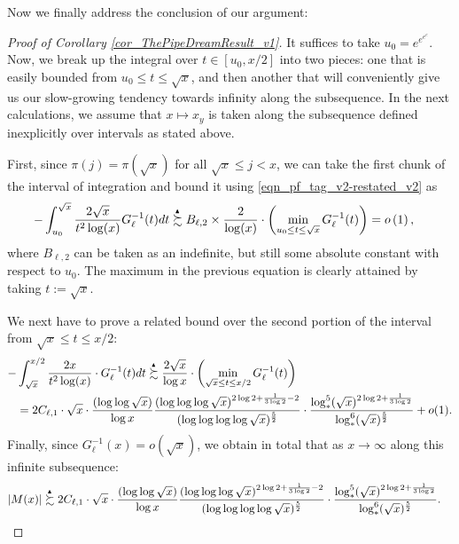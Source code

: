 \documentclass[11pt,reqno,a4letter]{article}
\numberwithin{figure}{section}
\numberwithin{table}{section}
\theoremstyle{plain}
\numberwithin{theorem}{section}
\theoremstyle{definition}
\newcommand{\SuccSim}[0]{\overset{_{\scriptsize{\blacktriangle}}}{\succsim}}
\begin{document}
Now we finally address the conclusion of our argument: 

\begin{proof}[Proof of Corollary \ref{cor_ThePipeDreamResult_v1}] 
\label{proofOf_cor_ThePipeDreamResult_v1} 
It suffices to take $u_0 = e^{e^{e^{e}}}$. 
Now, we break up the integral over $t \in [u_0, x/2]$ into two pieces: one that is easily bounded 
from $u_0 \leq t \leq \sqrt{x}$, 
and then another that will conveniently give us our slow-growing tendency towards 
infinity along the subsequence. 
In the next calculations, we assume that $x \mapsto x_y$ is taken along the 
subsequence defined inexplicitly over intervals as stated above.

First, since $\pi(j) = \pi(\sqrt{x})$ for all $\sqrt{x} \leq j < x$, we can take the first chunk 
of the interval of integration and bound it using \eqref{eqn_pf_tag_v2-restated_v2} as 
\begin{align*} 
-\int_{u_0}^{\sqrt{x}} \frac{2\sqrt{x}}{t^2 \log(x)} G_{\ell}^{-1}(t) dt & \SuccSim 
     B_{\ell,2} \times \frac{2}{\log(x)} \cdot \left(\min\limits_{u_0 \leq t \leq \sqrt{x}} 
     G_{\ell}^{-1}(t)\right) = o\left(1\right), 
\end{align*} 
where $B_{\ell,2}$ can be taken as an indefinite, but still some absolute constant with respect to $u_0$. 
The maximum in the previous equation is clearly attained by taking $t := \sqrt{x}$. 

We next have to prove a related bound over the second portion of the interval from 
$\sqrt{x} \leq t \leq x/2$: 
\begin{align*} 
- & \int_{\sqrt{x}}^{x/2} \frac{2 x}{t^2 \log(x)} \cdot G_{\ell}^{-1}(t) dt \SuccSim 
     \frac{2\sqrt{x}}{\log x} \cdot \left(\min_{\sqrt{x} \leq t \leq x/2} G_{\ell}^{-1}(t)\right) \\ 
     & = 2C_{\ell,1} \cdot \sqrt{x} \cdot 
     \frac{(\log\log \sqrt{x})}{\log x} \frac{(\log\log\log \sqrt{x})^{2\log 2+\frac{1}{3\log 2} - 2}}{ 
     (\log\log\log\log \sqrt{x})^{\frac{5}{2}}} \cdot \frac{\log_{\ast}^5(\sqrt{x})^{2\log 2 + \frac{1}{3\log 2}}}{ 
     \log_{\ast}^{6}(\sqrt{x})^{\frac{5}{2}}} + o(1). 
\end{align*} 
Finally, since $G_{\ell}^{-1}(x) = o(\sqrt{x})$, we obtain in total that as 
$x \rightarrow \infty$ along this infinite subsequence: 
\begin{align*} 
|M(x)| & \SuccSim 
     2C_{\ell,1} \cdot \sqrt{x} \cdot 
     \frac{(\log\log \sqrt{x})}{\log x} \frac{(\log\log\log \sqrt{x})^{2\log 2+\frac{1}{3\log 2} - 2}}{ 
     (\log\log\log\log \sqrt{x})^{\frac{5}{2}}} \cdot \frac{\log_{\ast}^5(\sqrt{x})^{2\log 2 + \frac{1}{3\log 2}}}{ 
     \log_{\ast}^{6}(\sqrt{x})^{\frac{5}{2}}}. 
     \qedhere 
\end{align*} 
\end{proof} 
\end{document}
